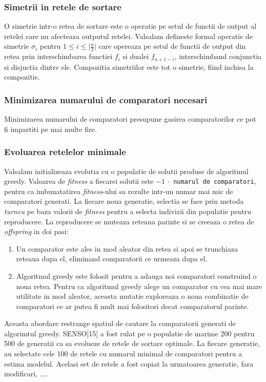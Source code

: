 \documentclass[12pt]{article}
\begin{document}
\subsubsection{Simetrii in retele de sortare}
O simetrie intr-o retea de sortare este o operatie pe setul de functii de output al retelei care nu afecteaza outputul retelei. Valsalam defineste formal operatie de simetrie  $\sigma_i$ pentru $1 \leq i \leq \mid\frac{n}{2}|$ care opereaza pe setul de functii de output din retea prin interschimbarea functiei $f_i$ si dualei $f_{n+1-i}$, interschimband conjunctia si disjuctia dintre ele. Compozitia simetriilor este tot o simetrie, fiind inchisa la compozitie. 

\subsubsection{Minimizarea numarului de comparatori necesari}

Minimizarea numarului de comparatori presupune gasirea comparatorilor ce pot fi impartiti pe mai multe fire.

\subsubsection{Evoluarea retelelor minimale}

Valsalam initializeaza evolutia cu o populatie de solutii produse de algoritmul greedy. Valoarea de \textit{fitness} a fiecarei solutii este $-1 \  \cdot $ \texttt{numarul de comparatori}, pentru ca imbunatatirea \textit{fitness}-ului sa rezulte intr-un numar mai mic de comparatori generati. La fiecare noua generatie, selectia se face prin metoda \textit{turneu} pe baza valorii de \textit{fitness} pentru a selecta indivizii din populatie pentru reproducere. La reproducere se muteaza reteaua parinte si se creeaza o retea de \textit{offspring} in doi pasi:
\begin{enumerate}
	\item Un comparator este ales in mod aleator din retea si apoi se trunchiaza reteaua dupa el, eliminand comparatorii ce urmeaza dupa el.
	\item Algoritmul greedy este folosit pentru a adauga noi comparatori construind o noua retea. Pentru ca algoritmul greedy alege un comparator cu cea mai mare utilitate in mod aleator, aceasta mutatie exploreaza o noua combinatie de comparatori ce ar putea fi mult mai folositori decat comparatorul parinte.
\end{enumerate}
Aceasta abordare restrange spatiul de cautare la comparatorii generati de algorimtul greedy.
SENSO[15] a fost rulat pe o populatie de marime 200 pentru 500 de generatii ca sa evolueze de retele de sortare optimale. La fiecare generatie, au selectate cele 100 de retele cu numarul minimal de comparatori pentru a estima modelul. Acelasi set de retele a fost copiat la urmatoarea generatie, fara modificari, ....
\end{document}
